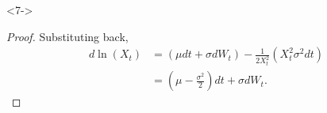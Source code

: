 \documentclass[10pt]{beamer}
\begin{document}
\begin{frame}[t]
\begin{onlyenv}
  \end{onlyenv}
  \begin{onlyenv}<7->
    \begin{proof}
        Substituting back,
        \begin{align*}
          d\ln(X_t) &= (\mu dt + \sigma dW_t) - \frac{1}{2X_t^2}(X_t^2 \sigma^2 dt) \\
          &= (\mu - \frac{\sigma^2}{2})dt + \sigma dW_t.
        \end{align*}
    \end{proof}
  \end{onlyenv}
\end{frame}
\end{document}
